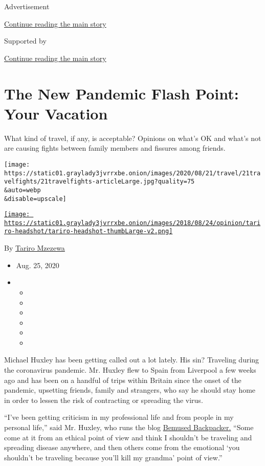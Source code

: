 Advertisement

\protect\hyperlink{after-top}{Continue reading the main story}

Supported by

\protect\hyperlink{after-sponsor}{Continue reading the main story}

\hypertarget{the-new-pandemic-flash-point-your-vacation}{%
\section{The New Pandemic Flash Point: Your
Vacation}\label{the-new-pandemic-flash-point-your-vacation}}

What kind of travel, if any, is acceptable? Opinions on what's OK and
what's not are causing fights between family members and fissures among
friends.

\texttt{[image: https://static01.graylady3jvrrxbe.onion/images/2020/08/21/travel/21travelfights/21travelfights-articleLarge.jpg?quality=75\\\&auto=webp\\\&disable=upscale]}

\href{https://www.nytimes3xbfgragh.onion/by/tariro-mzezewa}{\texttt{[image: https://static01.graylady3jvrrxbe.onion/images/2018/08/24/opinion/tariro-headshot/tariro-headshot-thumbLarge-v2.png]}}

By \href{https://www.nytimes3xbfgragh.onion/by/tariro-mzezewa}{Tariro
Mzezewa}

\begin{itemize}
\item
  Aug. 25, 2020
\item
  \begin{itemize}
  \item
  \item
  \item
  \item
  \item
  \item
  \end{itemize}
\end{itemize}

Michael Huxley has been getting called out a lot lately. His sin?
Traveling during the coronavirus pandemic. Mr. Huxley flew to Spain from
Liverpool a few weeks ago and has been on a handful of trips within
Britain since the onset of the pandemic, upsetting friends, family and
strangers, who say he should stay home in order to lessen the risk of
contracting or spreading the virus.

``I've been getting criticism in my professional life and from people in
my personal life,'' said Mr. Huxley, who runs the blog
\href{https://bemusedbackpacker.com/}{Bemused Backpacker.} ``Some come
at it from an ethical point of view and think I shouldn't be traveling
and spreading disease anywhere, and then others come from the emotional
`you shouldn't be traveling because you'll kill my grandma' point of
view.''

